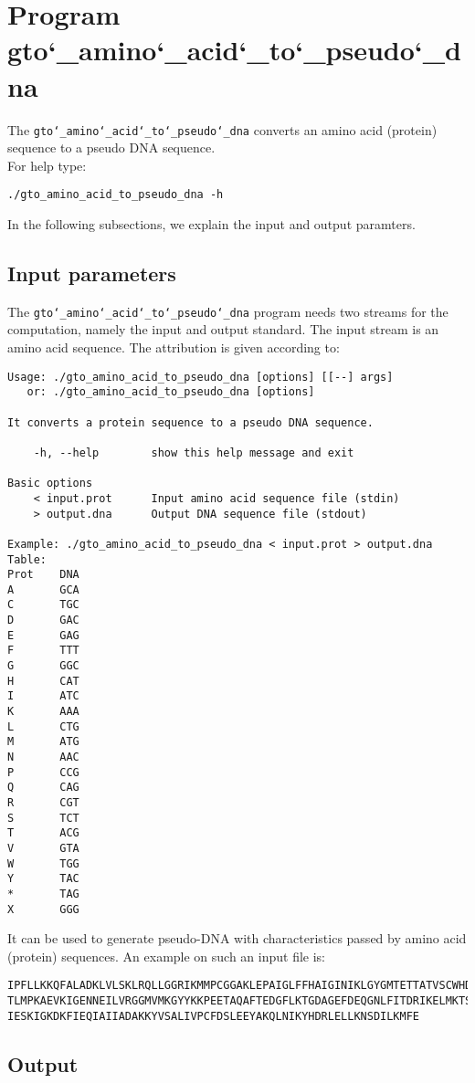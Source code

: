 \section{Program gto\char`_amino\char`_acid\char`_to\char`_pseudo\char`_dna}

The \texttt{gto\char`_amino\char`_acid\char`_to\char`_pseudo\char`_dna} converts an amino acid (protein) sequence to a pseudo DNA sequence.\\
For help type:
\begin{lstlisting}
./gto_amino_acid_to_pseudo_dna -h
\end{lstlisting}
In the following subsections, we explain the input and output paramters.

\subsection*{Input parameters}

The \texttt{gto\char`_amino\char`_acid\char`_to\char`_pseudo\char`_dna} program needs two streams for the computation,
namely the input and output standard. The input stream is an amino acid sequence.
The attribution is given according to:
\begin{lstlisting}
Usage: ./gto_amino_acid_to_pseudo_dna [options] [[--] args]
   or: ./gto_amino_acid_to_pseudo_dna [options]

It converts a protein sequence to a pseudo DNA sequence.

    -h, --help        show this help message and exit

Basic options
    < input.prot      Input amino acid sequence file (stdin)
    > output.dna      Output DNA sequence file (stdout)

Example: ./gto_amino_acid_to_pseudo_dna < input.prot > output.dna
Table:
Prot	DNA
A		GCA
C		TGC
D		GAC
E		GAG
F		TTT
G		GGC
H		CAT
I		ATC
K		AAA
L		CTG
M		ATG
N		AAC
P		CCG
Q		CAG
R		CGT
S		TCT
T		ACG
V		GTA
W		TGG
Y		TAC
*		TAG
X		GGG
\end{lstlisting}
It can be used to generate pseudo-DNA with characteristics passed by amino acid (protein) sequences. An example on such an input file is:
\begin{lstlisting}
IPFLLKKQFALADKLVLSKLRQLLGGRIKMMPCGGAKLEPAIGLFFHAIGINIKLGYGMTETTATVSCWHDFQFNPNSIG
TLMPKAEVKIGENNEILVRGGMVMKGYYKKPEETAQAFTEDGFLKTGDAGEFDEQGNLFITDRIKELMKTSNGKYIAPQY
IESKIGKDKFIEQIAIIADAKKYVSALIVPCFDSLEEYAKQLNIKYHDRLELLKNSDILKMFE
\end{lstlisting}

\subsection*{Output}

